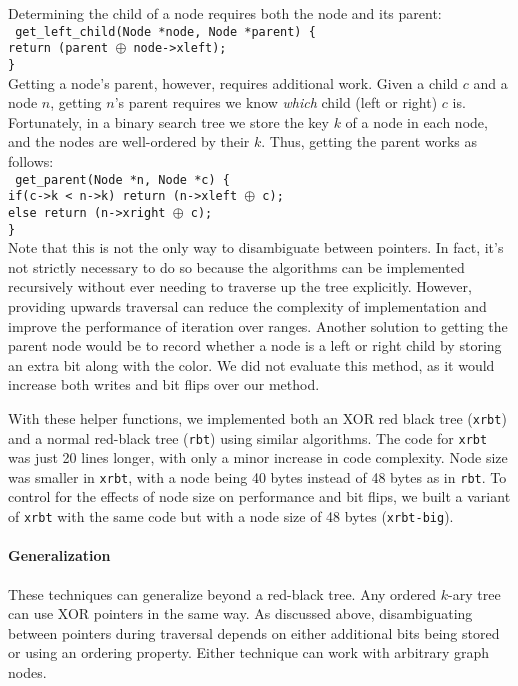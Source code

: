 Determining the child of a node requires both the node and its parent:\\
\texttt{
	get\_left\_child(Node *node, Node *parent) \{\\
	\indent return (parent $\oplus$ node->xleft); \\
	\}
}\\
Getting a node's parent, however, requires additional work. Given a child $c$ and a
node $n$, getting $n$'s parent requires we know \textit{which} child (left or
right) $c$ is. Fortunately, in a binary search tree we store the key $k$ of a node
in each node, and the nodes are well-ordered by their $k$. Thus, getting the
parent works as follows:\\
\texttt{
	get\_parent(Node *n, Node *c) \{\\
	\indent if(c->k < n->k) return (n->xleft $\oplus$ c);\\
	\indent else return (n->xright $\oplus$ c);\\
	\}}\\
Note that this is not the only way to disambiguate between pointers. In fact,
it's not strictly necessary to do so because the algorithms can be implemented
recursively without ever needing to traverse up the tree explicitly. However, providing upwards
traversal can reduce the complexity of implementation and improve the performance of iteration over
ranges. Another
solution to getting the parent node would be to record whether a node is a left
or right child by storing an extra bit along with the color. We did not
evaluate this method, as it would increase both writes and bit flips over our method.

\newcommand{\xrbt}{\texttt{xrbt}\xspace}
\newcommand{\xrbtbig}{\texttt{xrbt-big}\xspace}
\newcommand{\rbt}{\texttt{rbt}\xspace}

With these helper functions, we implemented both an XOR red black
tree (\xrbt) and a normal red-black tree (\rbt) using similar algorithms.
The code for \xrbt was just 20 lines longer, with only a
minor increase in code complexity. Node size was smaller in \xrbt,
with a node being 40 bytes instead of 48 bytes as in \rbt. To control for
the effects of node size on performance and bit flips, we built a variant of
\xrbt with the same code but with a node size of 48 bytes (\xrbtbig).


\paragraph{Generalization} These techniques can generalize beyond a red-black tree. Any ordered
$k$-ary tree can use XOR pointers in the same way. As discussed above, disambiguating between pointers
during traversal depends on either additional bits being stored or using an ordering property.
Either technique can work with arbitrary graph nodes.

